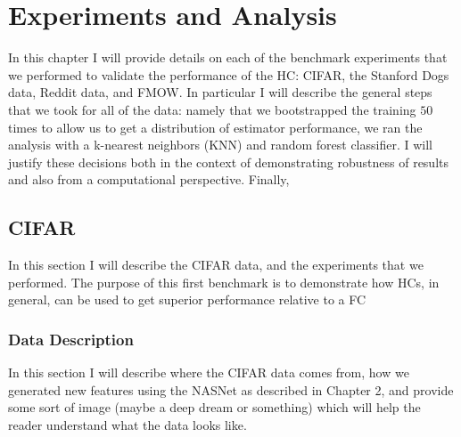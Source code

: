 \documentclass[../thesis.tex]{subfiles}
\begin{document}
\chapter{Experiments and Analysis}
In this chapter I will provide details on each of the benchmark experiments that we performed to validate the performance of the HC: CIFAR, the Stanford Dogs data, Reddit data, and FMOW. In particular I will describe the general steps that we took for all of the data: namely that we bootstrapped the training $50$ times to allow us to get a distribution of estimator performance, we ran the analysis with a k-nearest neighbors (KNN) and random forest classifier. I will justify these decisions both in the context of demonstrating robustness of results and also from a computational perspective. Finally, 

\section{CIFAR}
In this section I will describe the CIFAR data, and the experiments that we performed. The purpose of this first benchmark is to demonstrate how HCs, in general, can be used to get superior performance relative to a FC

\subsection{Data Description}
In this section I will describe where the CIFAR data comes from, how we generated new features using the NASNet as described in Chapter 2, and provide some sort of image (maybe a deep dream or something) which will help the reader understand what the data looks like.

\subsection{}
\end{document}
